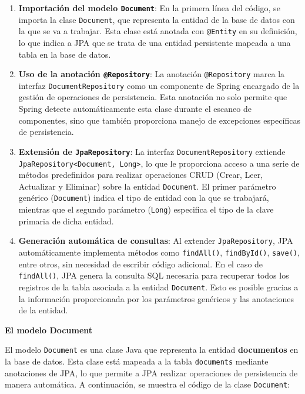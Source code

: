 \documentclass[draft]{scrbook}
\begin{document}
\begin{enumerate}
\item \textbf{Importación del modelo \texttt{Document}}:
En la primera línea del código, se importa la clase \texttt{Document}, que representa la entidad de la base de datos con la que se va a trabajar. Esta clase está anotada con \texttt{@Entity} en su definición, lo que indica a JPA que se trata de una entidad persistente mapeada a una tabla en la base de datos.

\item \textbf{Uso de la anotación \texttt{@Repository}}: 
La anotación \texttt{@Repository} marca la interfaz \texttt{DocumentRepository} como un componente de Spring encargado de la gestión de operaciones de persistencia. Esta anotación no solo permite que Spring detecte automáticamente esta clase durante el escaneo de componentes, sino que también proporciona manejo de excepciones específicas de persistencia.

\item \textbf{Extensión de \texttt{JpaRepository}}: 
La interfaz \texttt{DocumentRepository} extiende \texttt{JpaRepository<Document, Long>}, lo que le proporciona acceso a una serie de métodos predefinidos para realizar operaciones CRUD (Crear, Leer, Actualizar y Eliminar) sobre la entidad \texttt{Document}. El primer parámetro genérico (\texttt{Document}) indica el tipo de entidad con la que se trabajará, mientras que el segundo parámetro (\texttt{Long}) especifica el tipo de la clave primaria de dicha entidad.

\item \textbf{Generación automática de consultas}: 
Al extender \texttt{JpaRepository}, JPA automáticamente implementa métodos como \texttt{findAll()}, \texttt{findById()}, \texttt{save()}, entre otros, sin necesidad de escribir código adicional. En el caso de \texttt{findAll()}, JPA genera la consulta SQL necesaria para recuperar todos los registros de la tabla asociada a la entidad \texttt{Document}. Esto es posible gracias a la información proporcionada por los parámetros genéricos y las anotaciones de la entidad.

\end{enumerate}


\textbf{El modelo Document}

El modelo \texttt{Document} es una clase Java que representa la entidad \textbf{documentos} en la base de datos. Esta clase está mapeada a la tabla \texttt{documents} mediante anotaciones de JPA, lo que permite a JPA realizar operaciones de persistencia de manera automática. A continuación, se muestra el código de la clase \texttt{Document}:
\end{document}
